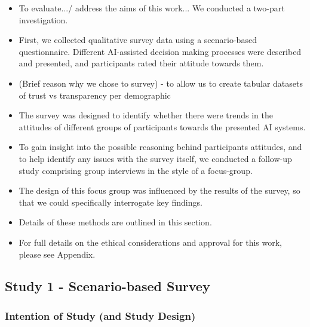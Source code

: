 \documentclass[manuscript,screen,review]{acmart}
\begin{document}
\begin{itemize}
\item To evaluate.../ address the aims of this work... We conducted a two-part investigation.
\item First, we collected qualitative survey data using a scenario-based questionnaire. Different AI-assisted decision making processes were described and presented, and participants rated their attitude towards them.
\item (Brief reason why we chose to survey) -  to allow us to create tabular datasets of trust vs transparency per demographic
\end{itemize}
\begin{itemize}
\item The survey was designed to identify whether there were trends in the attitudes of different groups of participants towards the presented AI systems. 
\item To gain insight into the possible reasoning behind participants attitudes, and to help identify any issues with the survey itself, we conducted a follow-up study comprising group interviews in the style of a focus-group.
\item The design of this focus group was influenced by the results of the survey, so that we could specifically interrogate key findings. 
\item Details of these methods are outlined in this section. 
\item For full details on the ethical considerations and approval for this work, please see Appendix.
\end{itemize}


\subsection{Study 1 - Scenario-based Survey }
\subsubsection{Intention of Study (and Study Design)} 
\label{study1_intentions}

\end{document}
